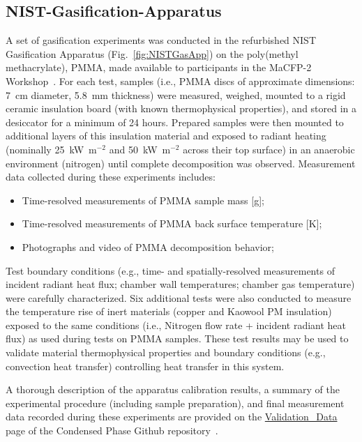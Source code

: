 \documentclass[12pt]{article}
\begin{document}
\subsection{NIST-Gasification-Apparatus}
A set of gasification experiments was conducted in the refurbished NIST Gasification Apparatus (Fig.~\ref{fig:NISTGasApp}) on the poly(methyl methacrylate), PMMA, made available to participants in the MaCFP-2 Workshop~\cite{Leventon2023Gasification}. For each test, samples (i.e., PMMA discs of approximate dimensions: 7~cm diameter, 5.8~mm thickness) were measured, weighed, mounted to a rigid ceramic insulation board (with known thermophysical properties), and stored in a desiccator for a minimum of 24 hours. Prepared samples were then mounted to additional layers of this insulation material and exposed to radiant heating (nominally 25~kW~m$^{-2}$ and 50~kW~m$^{-2}$ across their top surface) in an anaerobic environment (nitrogen) until complete decomposition was observed. Measurement data collected during these experiments includes:
\begin{itemize}[noitemsep]
\item Time-resolved measurements of PMMA sample mass [g];
\item Time-resolved measurements of PMMA back surface temperature [K];
\item Photographs and video of PMMA decomposition behavior;
\end{itemize}

Test boundary conditions (e.g., time- and spatially-resolved measurements of incident radiant heat flux; chamber wall temperatures; chamber gas temperature) were carefully characterized. Six additional tests were also conducted to measure the temperature rise of inert materials (copper and Kaowool PM insulation) exposed to the same conditions (i.e., Nitrogen flow rate + incident radiant heat flux) as used during tests on PMMA samples. These test results may be used to validate material thermophysical properties and boundary conditions (e.g., convection heat transfer) controlling heat transfer in this system.

A thorough description of the apparatus calibration results, a summary of the experimental procedure (including sample preparation), and final measurement data recorded during these experiments are provided on the \href{https://github.com/MaCFP/matl-db/tree/master/PMMA/Validation_Data/NIST_Gasification_Apparatus}{Validation\_Data} page of the Condensed Phase Github repository~\cite{MaCFP-cond-db}.
\end{document}
